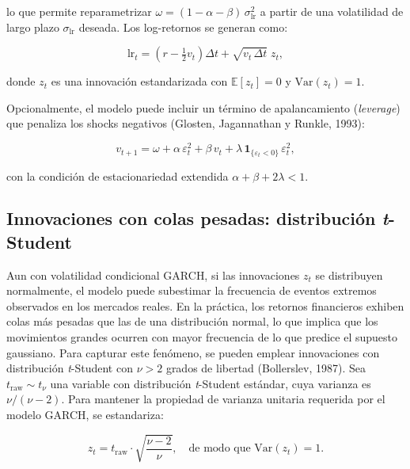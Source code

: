 \documentclass[11pt,a4paper,spanish]{article}
\numberwithin{equation}{section} %
\begin{document}
lo que permite reparametrizar $\omega = (1 - \alpha - \beta)\,\sigma_{\text{lr}}^2$ a partir de una volatilidad de largo plazo $\sigma_{\text{lr}}$ deseada. Los log-retornos se generan como:

\begin{equation}
\text{lr}_t = \left(r - \tfrac{1}{2} v_t\right) \Delta t + \sqrt{v_t\,\Delta t}\; z_t,
\end{equation}

donde $z_t$ es una innovación estandarizada con $\mathbb{E}[z_t] = 0$ y $\text{Var}(z_t) = 1$.

Opcionalmente, el modelo puede incluir un término de apalancamiento (\textit{leverage}) que penaliza los shocks negativos (Glosten, Jagannathan y Runkle, 1993):

\begin{equation}
v_{t+1} = \omega + \alpha\, \varepsilon_t^2 + \beta\, v_t + \lambda\, \mathbf{1}_{\{\varepsilon_t < 0\}}\, \varepsilon_t^2,
\end{equation}

con la condición de estacionariedad extendida $\alpha + \beta + 2\lambda < 1$.

\subsection{Innovaciones con colas pesadas: distribución \textit{t}-Student}\label{subsec:student_t}

Aun con volatilidad condicional GARCH, si las innovaciones $z_t$ se distribuyen normalmente, el modelo puede subestimar la frecuencia de eventos extremos observados en los mercados reales. En la práctica, los retornos financieros exhiben colas más pesadas que las de una distribución normal, lo que implica que los movimientos grandes ocurren con mayor frecuencia de lo que predice el supuesto gaussiano. Para capturar este fenómeno, se pueden emplear innovaciones con distribución \textit{t}-Student con $\nu > 2$ grados de libertad (Bollerslev, 1987). Sea $t_{\text{raw}} \sim t_\nu$ una variable con distribución \textit{t}-Student estándar, cuya varianza es $\nu / (\nu - 2)$. Para mantener la propiedad de varianza unitaria requerida por el modelo GARCH, se estandariza:

\begin{equation}
z_t = t_{\text{raw}} \cdot \sqrt{\frac{\nu - 2}{\nu}}, \quad \text{de modo que } \text{Var}(z_t) = 1.
\label{eq:student_t_standardized}
\end{equation}
\end{document}
